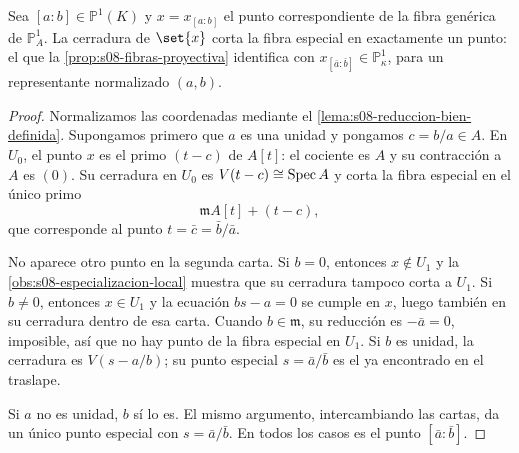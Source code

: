 \begin{prop}
\label{prop:s08-cerradura-reduccion}
Sea $[a:b]\in\mathbb P^1(K)$ y $x=x_{[a:b]}$ el punto correspondiente de la fibra genérica de $\mathbb P_A^1$. La cerradura de $\set{x}$ corta la fibra especial en exactamente un punto: el que la \cref{prop:s08-fibras-proyectiva} identifica con $x_{[\bar a:\bar b]}\in\mathbb P_\kappa^1$, para un representante normalizado $(a,b)$.
\end{prop}
\begin{proof}
Normalizamos las coordenadas mediante el \cref{lema:s08-reduccion-bien-definida}. Supongamos primero que $a$ es una unidad y pongamos $c=b/a\in A$. En $U_0$, el punto $x$ es el primo $(t-c)$ de $A[t]$: el cociente es $A$ y su contracción a $A$ es $(0)$. Su cerradura en $U_0$ es $V(t-c)\cong\operatorname{Spec} A$ y corta la fibra especial en el único primo
\[
\mathfrak mA[t]+(t-c),
\]
que corresponde al punto $t=\bar c=\bar b/\bar a$.

No aparece otro punto en la segunda carta. Si $b=0$, entonces $x\notin U_1$ y la \cref{obs:s08-especializacion-local} muestra que su cerradura tampoco corta a $U_1$. Si $b\ne0$, entonces $x\in U_1$ y la ecuación $bs-a=0$ se cumple en $x$, luego también en su cerradura dentro de esa carta. Cuando $b\in\mathfrak m$, su reducción es $-\bar a=0$, imposible, así que no hay punto de la fibra especial en $U_1$. Si $b$ es unidad, la cerradura es $V(s-a/b)$; su punto especial $s=\bar a/\bar b$ es el ya encontrado en el traslape.

Si $a$ no es unidad, $b$ sí lo es. El mismo argumento, intercambiando las cartas, da un único punto especial con $s=\bar a/\bar b$. En todos los casos es el punto $[\bar a:\bar b]$.
\end{proof}

